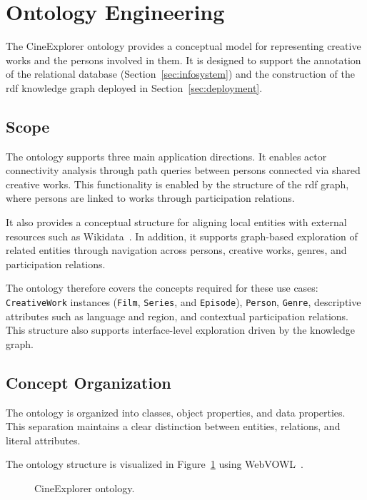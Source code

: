 \section{Ontology Engineering}
\label{sec:ontology}

The CineExplorer ontology provides a conceptual model for representing creative works and the persons involved in them. It is designed to support the annotation of the relational database (Section~\ref{sec:infosystem}) and the construction of the \ac{rdf} knowledge graph deployed in Section~\ref{sec:deployment}.

\subsection{Scope}

The ontology supports three main application directions. It enables actor connectivity analysis through path queries between persons connected via shared creative works. This functionality is enabled by the structure of the \ac{rdf} graph, where persons are linked to works through participation relations.

It also provides a conceptual structure for aligning local entities with external resources such as Wikidata~\cite{wikidata}. In addition, it supports graph-based exploration of related entities through navigation across persons, creative works, genres, and participation relations.

The ontology therefore covers the concepts required for these use cases: \texttt{CreativeWork} instances (\texttt{Film}, \texttt{Series}, and \texttt{Episode}), \texttt{Person}, \texttt{Genre}, descriptive attributes such as language and region, and contextual participation relations. This structure also supports interface-level exploration driven by the knowledge graph.
\subsection{Concept Organization}

The ontology is organized into classes, object properties, and data properties. This separation maintains a clear distinction between entities, relations, and literal attributes.

The ontology structure is visualized in Figure~\ref{fig:ontology} using WebVOWL~\cite{lohmann2014webvowl}.

\begin{figure}
    \centering
    
    \caption{CineExplorer ontology.}
    \label{fig:ontology}
\end{figure}

